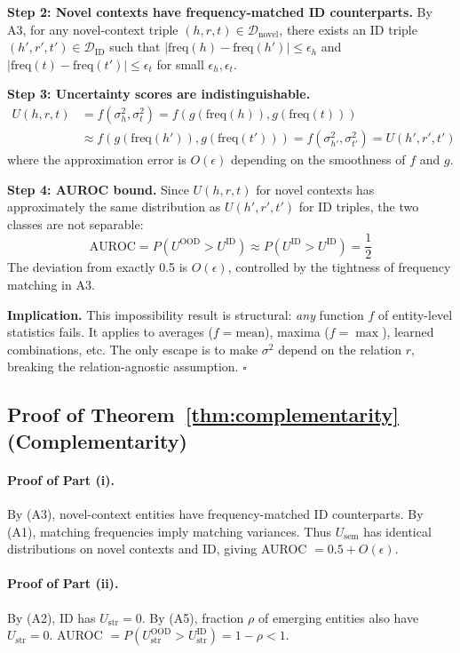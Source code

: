 \documentclass[accepted]{uai2024}  %
\newcommand{\freq}{\text{freq}}
\begin{document}
\textbf{Step 2: Novel contexts have frequency-matched ID counterparts.} By A3, for any novel-context triple $(h,r,t) \in \mathcal{D}_{\text{novel}}$, there exists an ID triple $(h',r',t') \in \mathcal{D}_{\text{ID}}$ such that $|\freq(h) - \freq(h')| \leq \epsilon_h$ and $|\freq(t) - \freq(t')| \leq \epsilon_t$ for small $\epsilon_h, \epsilon_t$.

\textbf{Step 3: Uncertainty scores are indistinguishable.}
\begin{align}
U(h,r,t) &= f(\sigma^2_h, \sigma^2_t) = f(g(\freq(h)), g(\freq(t))) \\
&\approx f(g(\freq(h')), g(\freq(t'))) = f(\sigma^2_{h'}, \sigma^2_{t'}) = U(h',r',t')
\end{align}
where the approximation error is $O(\epsilon)$ depending on the smoothness of $f$ and $g$.

\textbf{Step 4: AUROC bound.} Since $U(h,r,t)$ for novel contexts has approximately the same distribution as $U(h',r',t')$ for ID triples, the two classes are not separable:
\begin{equation}
\text{AUROC} = P(U^{\text{OOD}} > U^{\text{ID}}) \approx P(U^{\text{ID}} > U^{\text{ID}}) = \frac{1}{2}
\end{equation}
The deviation from exactly 0.5 is $O(\epsilon)$, controlled by the tightness of frequency matching in A3.

\textbf{Implication.} This impossibility result is structural: \emph{any} function $f$ of entity-level statistics fails. It applies to averages ($f = \text{mean}$), maxima ($f = \max$), learned combinations, etc. The only escape is to make $\sigma^2$ depend on the relation $r$, breaking the relation-agnostic assumption. $\square$

\subsection{Proof of Theorem~\ref{thm:complementarity} (Complementarity)}

\paragraph{Proof of Part (i).}
By (A3), novel-context entities have frequency-matched ID counterparts. By (A1), matching frequencies imply matching variances. Thus $U_{\text{sem}}$ has identical distributions on novel contexts and ID, giving AUROC $= 0.5 + O(\epsilon)$.

\paragraph{Proof of Part (ii).}
By (A2), ID has $U_{\text{str}} = 0$. By (A5), fraction $\rho$ of emerging entities also have $U_{\text{str}} = 0$. AUROC $= P(U_{\text{str}}^{\text{OOD}} > U_{\text{str}}^{\text{ID}}) = 1 - \rho < 1$.
\end{document}
